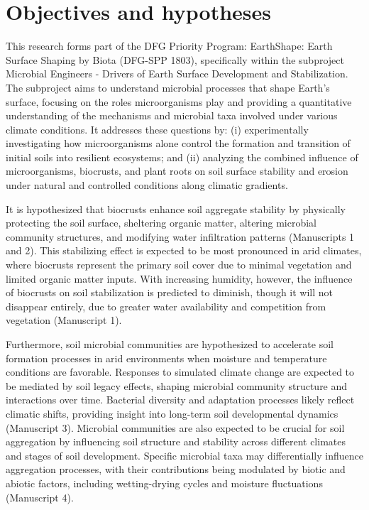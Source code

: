 \section{Objectives and hypotheses}
\label{sec:ObjectivesHypothesis}

This research forms part of the DFG Priority Program: EarthShape: Earth Surface Shaping by Biota (DFG-SPP 1803), specifically within the subproject Microbial Engineers - Drivers of Earth Surface Development and Stabilization. The subproject aims to understand microbial processes that shape Earth's surface, focusing on the roles microorganisms play and providing a quantitative understanding of the mechanisms and microbial taxa involved under various climate conditions. It addresses these questions by: (i) experimentally investigating how microorganisms alone control the formation and transition of initial soils into resilient ecosystems; and (ii) analyzing the combined influence of microorganisms, biocrusts, and plant roots on soil surface stability and erosion under natural and controlled conditions along climatic gradients.

It is hypothesized that biocrusts enhance soil aggregate stability by physically protecting the soil surface, sheltering organic matter, altering microbial community structures, and modifying water infiltration patterns (Manuscripts 1 and 2). This stabilizing effect is expected to be most pronounced in arid climates, where biocrusts represent the primary soil cover due to minimal vegetation and limited organic matter inputs. With increasing humidity, however, the influence of biocrusts on soil stabilization is predicted to diminish, though it will not disappear entirely, due to greater water availability and competition from vegetation (Manuscript 1).

Furthermore, soil microbial communities are hypothesized to accelerate soil formation processes in arid environments when moisture and temperature conditions are favorable. Responses to simulated climate change are expected to be mediated by soil legacy effects, shaping microbial community structure and interactions over time. Bacterial diversity and adaptation processes likely reflect climatic shifts, providing insight into long-term soil developmental dynamics (Manuscript 3). Microbial communities are also expected to be crucial for soil aggregation by influencing soil structure and stability across different climates and stages of soil development. Specific microbial taxa may differentially influence aggregation processes, with their contributions being modulated by biotic and abiotic factors, including wetting-drying cycles and moisture fluctuations (Manuscript 4).

